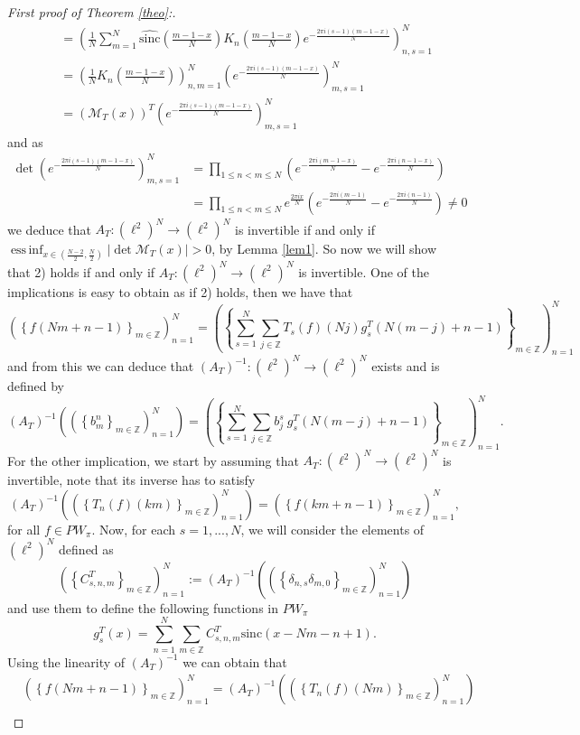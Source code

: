 \documentclass[reqno]{amsart}
\theoremstyle{plain}
\theoremstyle{definition}
\numberwithin{equation}{section}
\newcommand{\Z}{{\mathbb Z}}
\newcommand{\pa}[1]{\left(#1\right)}
\newcommand{\abs}[1]{\left\vert#1\right\vert}
\newcommand{\suc}[1]{\left\{#1\right\}}
\DeclareMathOperator{\essinf}{ess\,inf}
\providecommand{\abs}[1]{ \lvert#1  \rvert}
\newcommand{\sinc}{\mathrm{sinc}}
\begin{document}
\begin{proof}[First proof of Theorem \ref{theo}:]
\begin{align*}
		&\quad = \pa{\frac{1}{N} \sum_{m=1}^N \widehat{\sinc}\pa{\frac{m-1-x}{N}} K_n\pa{\frac{m-1-x}{N}}
		e^{-\frac{2\pi i \pa{s-1} \pa{m-1-x}}{N}}}_{n,s=1}^N \\
		&\quad = \pa{\frac{1}{N}K_n\pa{\frac{m-1-x}{N}}}_{n,m=1}^N 
        \pa{e^{-\frac{2\pi i (s-1) (m-1-x)}{N}}}_{m,s=1}^N \\
		&\quad = \pa{\mathcal{M}_T(x)}^T \pa{e^{-\frac{2\pi i (s-1) (m-1-x)}{N}}}_{m,s=1}^N 
	\end{align*}
	and as
	\begin{align*}
		\det \pa{e^{-\frac{2\pi i (s-1) (m-1-x)}{N}}}_{m,s=1}^N
		&= \prod_{1\leq n < m \leq N} \pa{e^{-\frac{2\pi i (m-1-x)}{N}}-e^{-\frac{2\pi i (n-1-x)}{N}}} \\
		&= \prod_{1\leq n < m \leq N} e^\frac{2\pi i x}{N} 
		\pa{e^{-\frac{2\pi i (m-1)}{N}}-e^{-\frac{2\pi i (n-1)}{N}}} \neq 0
	\end{align*}
	we deduce that $A_T:\pa{\ell^2}^N\to\pa{\ell^2}^N$ is invertible if and only if $\essinf_{x\in \pa{\frac{N-2}{2},\frac{N}{2}}} \abs{\det \mathcal{M}_T(x)}>0$, by Lemma \ref{lem1}. So now we will show that 2) holds if and only if $A_T:\pa{\ell^2}^N\to\pa{\ell^2}^N$ is invertible. One of the implications is easy to obtain as if 2) holds, then we have that
	$$\pa{\suc{f(Nm+n-1)}_{m\in\Z}}_{n=1}^N
	=\pa{\suc{\sum_{s=1}^N \sum_{j\in\Z} T_s(f)(Nj) g^T_s(N(m-j)+n-1)}_{m\in\Z}}_{n=1}^N$$
	and from this we can deduce that $\pa{A_T}^{-1}:\pa{\ell^2}^N\to\pa{\ell^2}^N$ exists and is defined by
	$$\pa{A_T}^{-1}\pa{\pa{\suc{b^n_m}_{m\in\Z}}_{n=1}^N}
	=\pa{\suc{\sum_{s=1}^N \sum_{j\in\Z} b_j^s \ g^T_s(N(m-j)+n-1)}_{m\in\Z}}_{n=1}^N.$$
	For the other implication, we start by assuming that $A_T:\pa{\ell^2}^N\to\pa{\ell^2}^N$ is invertible, 
	note that its inverse has to satisfy
	$$\pa{A_T}^{-1}\pa{\pa{\left\{ T_n(f)\pa{km}\right\}_{m\in\Z}}_{n=1}^N}
	=\pa{\left\{ f(km+n-1) \right\}_{m\in\Z}}_{n=1}^N,$$
	for all $f\in PW_\pi$. Now, for each $s=1,...,N$, we will consider the elements of $\pa{\ell^2}^N$ defined as
    $$\pa{\suc{C^T_{s,n,m}}_{m\in\Z}}_{n=1}^N:=\pa{A_T}^{-1}\pa{\pa{\suc{\delta_{n,s}\delta_{m,0}}_{m\in\Z}}_{n=1}^N}$$
    and use them to define the following functions in $PW_\pi$
    $$g^T_s(x)= \sum_{n=1}^N \sum_{m\in\Z} C^T_{s,n,m} \sinc (x-Nm-n+1).$$
    Using the linearity of $\pa{A_T}^{-1}$ we can obtain that
    \begin{align*}
		&\pa{\left\{ f(Nm+n-1) \right\}_{m\in\Z}}_{n=1}^N
		= \pa{A_T}^{-1}\pa{\pa{\left\{ T_n(f)(Nm)\right\}_{m\in\Z}}_{n=1}^N} \\

\end{align*}
\end{proof}
\end{document}
